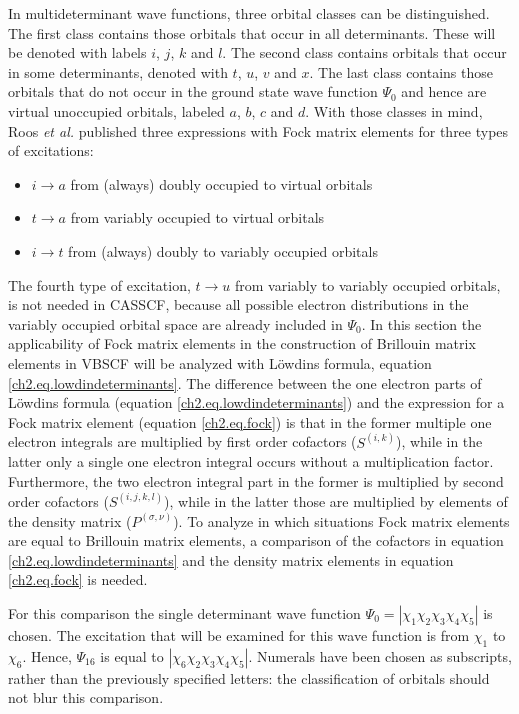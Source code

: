 In multideterminant wave functions, three orbital classes can be distinguished. The first class contains those orbitals that occur in all determinants. These will be denoted with labels $i$, $j$, $k$ and $l$. The second class contains orbitals that occur in some determinants, denoted with $t$, $u$, $v$ and $x$. The last class contains those orbitals that do not occur in the ground state wave function $\Psi_0$ and hence are virtual unoccupied orbitals, labeled $a$, $b$, $c$ and $d$. With those classes in mind, Roos \textit{et al.} published three expressions with Fock matrix elements for three types of excitations:
\begin{itemize}
\item{$i \rightarrow a$ from (always) doubly occupied to virtual orbitals}
\item{$t \rightarrow a$ from variably occupied to virtual orbitals}
\item{$i \rightarrow t$ from (always) doubly to variably occupied orbitals}
\end{itemize}
The fourth type of excitation, $t \rightarrow u$ from variably to variably occupied orbitals, is not needed in CASSCF, because all possible electron distributions in the variably occupied orbital space are already included in $\Psi_0$. In this section the applicability of Fock matrix elements in the construction of Brillouin matrix elements in VBSCF will be analyzed with L\"{o}wdins formula, equation \ref{ch2.eq.lowdindeterminants}. The difference between the one electron parts of L\"{o}wdins formula (equation \ref{ch2.eq.lowdindeterminants}) and the expression for a Fock matrix element (equation \ref{ch2.eq.fock}) is that in the former multiple one electron integrals are multiplied by first order cofactors ($S^{(i,k)}$), while in the latter only a single one electron integral occurs without a multiplication factor. Furthermore, the two electron integral part in the former is multiplied by second order cofactors ($S^{(i,j,k,l)}$), while in the latter those are multiplied by elements of the density matrix ($P^{(\sigma,\nu)}$). To analyze in which situations Fock matrix elements are equal to Brillouin matrix elements, a comparison of the cofactors in equation \ref{ch2.eq.lowdindeterminants} and the density matrix elements in equation \ref{ch2.eq.fock} is needed.

For this comparison the single determinant wave function $\Psi_0 = |\chi_1\chi_2\chi_3\chi_4\chi_5|$ is chosen. The excitation that will be examined for this wave function is from $\chi_1$ to $\chi_6$. Hence, $\Psi_{16}$ is equal to $|\chi_6\chi_2\chi_3\chi_4\chi_5|$. Numerals have been chosen as subscripts, rather than the previously specified letters: the classification of orbitals should not blur this comparison. 

